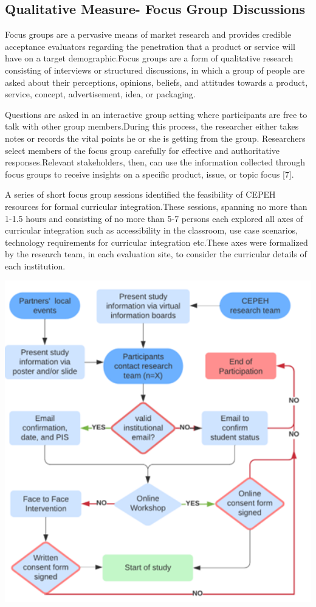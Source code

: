\documentclass[a4paper, nobind]{templates/ociamthesis}
\begin{document}
\hypertarget{qualitative-measure--focus-group-discussions}{%
\subsection{Qualitative Measure- Focus Group Discussions}\label{qualitative-measure--focus-group-discussions}}

Focus groups are a pervasive means of market research and provides credible acceptance evaluators regarding the penetration that a product or service will have on a target demographic.Focus groups are a form of qualitative research consisting of interviews or structured discussions, in which a group of people are asked about their perceptions, opinions, beliefs, and attitudes towards a product, service, concept, advertisement, idea, or packaging.

Questions are asked in an interactive group setting where participants are free to talk with other group members.During this process, the researcher either takes notes or records the vital points he or she is getting from the group.
Researchers select members of the focus group carefully for effective and authoritative responses.Relevant stakeholders, then, can use the information collected through focus groups to receive insights on a specific product, issue, or topic focus {[}7{]}.

A series of short focus group sessions identified the feasibility of CEPEH resources for formal curricular integration.These sessions, spanning no more than 1-1.5 hours and consisting of no more than 5-7 persons each explored all axes of curricular integration such as accessibility in the classroom, use case scenarios, technology requirements for curricular integration etc.These axes were formalized by the research team, in each evaluation site, to consider the curricular details of each institution.

\includegraphics[width=5.76in]{untitled-1}
\end{document}
